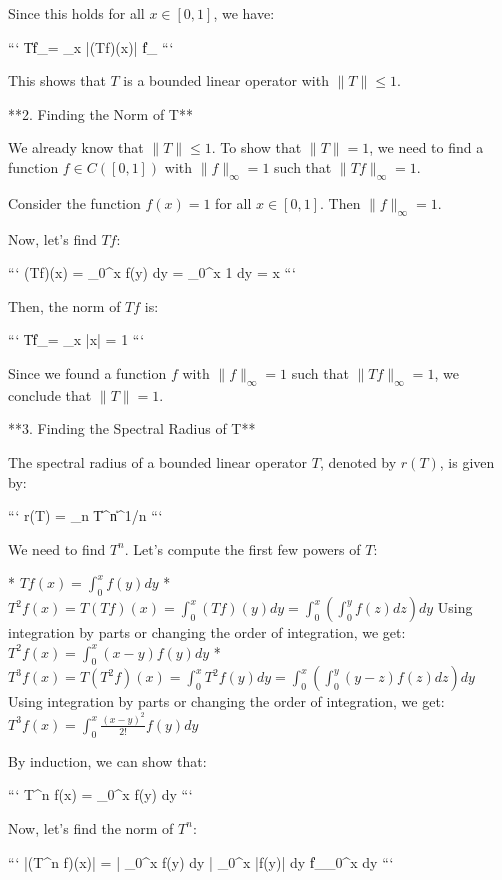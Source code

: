 Since this holds for all $x \in [0, 1]$, we have:

```
\|Tf\|_\infty = \sup_{x \in [0, 1]} |(Tf)(x)| \le \|f\|_\infty
```

This shows that $T$ is a bounded linear operator with $\|T\| \le 1$.

**2. Finding the Norm of T**

We already know that $\|T\| \le 1$. To show that $\|T\| = 1$, we need to find a function $f \in C([0, 1])$ with $\|f\|_\infty = 1$ such that $\|Tf\|_\infty = 1$.

Consider the function $f(x) = 1$ for all $x \in [0, 1]$. Then $\|f\|_\infty = 1$.

Now, let's find $Tf$:

```
(Tf)(x) = \int_0^x f(y) dy = \int_0^x 1 dy = x
```

Then, the norm of $Tf$ is:

```
\|Tf\|_\infty = \sup_{x \in [0, 1]} |x| = 1
```

Since we found a function $f$ with $\|f\|_\infty = 1$ such that $\|Tf\|_\infty = 1$, we conclude that $\|T\| = 1$.

**3. Finding the Spectral Radius of T**

The spectral radius of a bounded linear operator $T$, denoted by $r(T)$, is given by:

```
r(T) = \lim_{n \to \infty} \|T^n\|^{1/n}
```

We need to find $T^n$. Let's compute the first few powers of $T$:

* $Tf(x) = \int_0^x f(y) dy$
* $T^2f(x) = T(Tf)(x) = \int_0^x (Tf)(y) dy = \int_0^x \left( \int_0^y f(z) dz \right) dy$
    Using integration by parts or changing the order of integration, we get:
    $T^2f(x) = \int_0^x (x - y) f(y) dy$
* $T^3f(x) = T(T^2f)(x) = \int_0^x T^2f(y) dy = \int_0^x \left( \int_0^y (y - z) f(z) dz \right) dy$
    Using integration by parts or changing the order of integration, we get:
    $T^3f(x) = \int_0^x \frac{(x - y)^2}{2!} f(y) dy$

By induction, we can show that:

```
T^n f(x) = \int_0^x  f(y) dy
```

Now, let's find the norm of $T^n$:

```
|(T^n f)(x)| = \left| \int_0^x  f(y) dy \right|
             \le \int_0^x  |f(y)| dy
             \le \|f\|_\infty \int_0^x  dy
```

